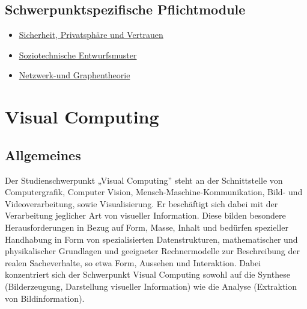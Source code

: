 \section*{Schwerpunktspezifische
Pflichtmodule\label{/mi-2017/modulbeschreibungen-master/schwerpunkt-soziotechnische-systeme}}\label{schwerpunktspezifische-pflichtmodulepathlabelmi-2017modulbeschreibungen-masterschwerpunkt-soziotechnische-systeme}

\begin{itemize}
\tightlist
\item
  \hyperref[/mi-2017/modulbeschreibungen-master/MA_WTW_Modul_IT-Sicherheit]{Sicherheit,
  Privatsphäre und Vertrauen}
\item
  \hyperref[/mi-2017/modulbeschreibungen-master/MA_SC_Soziotechnische_Entwurfsmuster]{Soziotechnische
  Entwurfsmuster}
\item
  \hyperref[/mi-2017/modulbeschreibungen-master/MA_SC_Modul_Netzwerk--und-Graphentheorie]{Netzwerk-und
  Graphentheorie}
\end{itemize}

\chapter{Visual
Computing\label{/mi-2017/modulbeschreibungen-master/schwerpunkt-visual-computing}}\label{visual-computingpathlabelmi-2017modulbeschreibungen-masterschwerpunkt-visual-computing}

\section*{Allgemeines\label{/mi-2017/modulbeschreibungen-master/schwerpunkt-visual-computing}}\label{allgemeinespathlabelmi-2017modulbeschreibungen-masterschwerpunkt-visual-computing}

Der Studienschwerpunkt „Visual Computing'' steht an der Schnittstelle
von Computergrafik, Computer Vision, Mensch-Maschine-Kommunikation,
Bild- und Videoverarbeitung, sowie Visualisierung. Er beschäftigt sich
dabei mit der Verarbeitung jeglicher Art von visueller Information.
Diese bilden besondere Herausforderungen in Bezug auf Form, Masse,
Inhalt und bedürfen spezieller Handhabung in Form von spezialisierten
Datenstrukturen, mathematischer und physikalischer Grundlagen und
geeigneter Rechnermodelle zur Beschreibung der realen Sacheverhalte, so
etwa Form, Aussehen und Interaktion. Dabei konzentriert sich der
Schwerpunkt Visual Computing sowohl auf die Synthese (Bilderzeugung,
Darstellung visueller Information) wie die Analyse (Extraktion von
Bildinformation).

